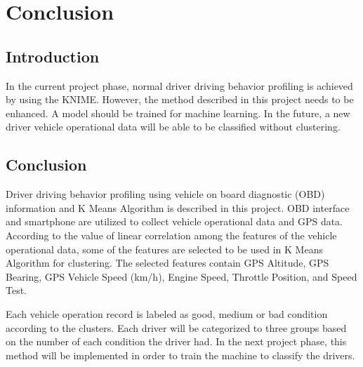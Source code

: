 \chapter{Conclusion}
\section{Introduction}
In the current project phase, normal driver driving behavior profiling is achieved by using the KNIME. However, the method described in this project needs to be enhanced. A model should be trained for machine learning. In the future, a new driver vehicle operational data will be able to be classified without clustering. 

\section{Conclusion}

Driver driving behavior profiling using vehicle on board diagnostic (OBD) information and K Means Algorithm is described in this project. OBD interface and smartphone are utilized to collect vehicle operational data and GPS data. According to the value of linear correlation among the features of the vehicle operational data, some of the features are selected to be used in K Means Algorithm for clustering. The selected features contain GPS Altitude, GPS Bearing, GPS Vehicle Speed (km/h), Engine Speed, Throttle Position, and Speed Test. 

Each vehicle operation record is labeled as good, medium or bad condition according to the clusters. Each driver will be categorized to three groups based on the number of each condition the driver had. In the next project phase, this method will be implemented in order to train the machine to classify the drivers.
